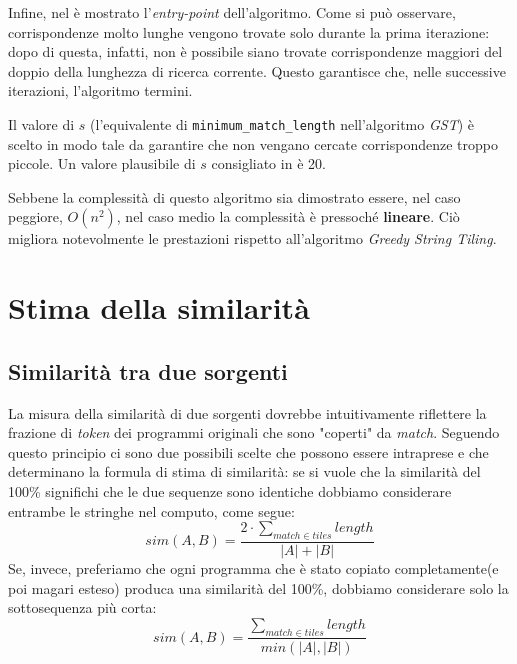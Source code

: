 

Infine, nel  è mostrato l'\textit{entry-point} dell'algoritmo.
%
Come si può osservare, corrispondenze molto lunghe vengono trovate solo durante la prima iterazione: dopo di questa, infatti, non è possibile siano trovate corrispondenze maggiori del doppio della lunghezza di ricerca corrente.
%
Questo garantisce che, nelle successive iterazioni, l'algoritmo termini.



Il valore di $s$ (l'equivalente di \texttt{minimum\_match\_length} nell'algoritmo \textit{GST}) è scelto in modo tale da garantire che non vengano cercate corrispondenze troppo piccole.
%
Un valore plausibile di $s$ consigliato in \cite{wise-running-93} è 20.

Sebbene la complessità di questo algoritmo sia dimostrato essere, nel caso peggiore, $O(n^2)$, nel caso medio la complessità è pressoché \textbf{lineare}.
%
Ciò migliora notevolmente le prestazioni rispetto all'algoritmo \textit{Greedy String Tiling}.

\section{Stima della similarità}

\subsection*{Similarità tra due sorgenti}
La misura della similarità di due sorgenti dovrebbe intuitivamente riflettere la frazione di \textit{token} dei programmi originali che sono "coperti" da \textit{match}.
%
Seguendo questo principio ci sono due possibili scelte che possono essere intraprese e che determinano la formula di stima di similarità: se si vuole che la similarità del 100\% significhi che le due sequenze sono identiche dobbiamo considerare entrambe le stringhe nel computo, come segue:
%
\begin{equation}
\label{eq:max-norm-sim}
	sim(A, B) = \frac{2 \cdot \sum_{match \in tiles} length}{|A|+|B|}
\end{equation}
%
Se, invece, preferiamo che ogni programma che è stato copiato completamente(e poi magari esteso) produca una similarità del 100\%, dobbiamo considerare solo la sottosequenza più corta:
%
\begin{equation}
\label{eq:avg-norm-sim}
	sim(A, B) = \frac{\sum_{match \in tiles} length}{min(|A|, |B|)}
\end{equation} 

